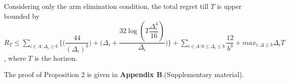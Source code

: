 


\begin{proposition}
Considering only the arm elimination condition, the total regret till $T$ is upper bounded by $R_{T}\leq \sum_{i\in A:\Delta_{i}\geq b}\bigg \lbrace \bigg(\dfrac{44}{(\Delta_{i})^{3}}\bigg) + \bigg(\Delta_{i}+\dfrac{32\log{(T\dfrac{\Delta_{i}^{4}}{16})}}{\Delta_{i}}\bigg)\bigg\rbrace + \sum_{i\in A:0\leq\Delta_{i}\leq b}\dfrac{12}{b^{3}} + max_{i:\Delta\leq b}\Delta_{i}T$, where $T$ is the horizon.
\end{proposition}

	The proof of Proposition 2 is given in \textbf{Appendix B}.(Supplementary material).

